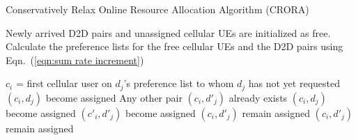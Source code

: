 \documentclass[times]{dacauth}
\begin{document}
\par
 \begin{algorithm}	
   \caption{Conservatively Relax Online Resource Allocation Algorithm (CRORA)}
   \label{algorthm3}
    \begin{algorithmic}[1]

       \State Newly arrived D2D pairs and unassigned cellular UEs are initialized as free.  
        \State Calculate the preference lists for the free cellular UEs and the D2D pairs using Eqn.~(\ref{eqn:sum rate increment})
			
		
			\State $c_i$ = first cellular user on $d_j$'s preference list to whom $d_j$ has not yet requested
				\State $(c_i,d_j)$ become assigned
			\Else
				\State Any other pair $(c_i, d'_j)$ already exists
                     	\State $(c_i,d_j)$ become assigned
                     	\State $(c'_i,d'_j)$ become assigned                     	
					 \Else
						\State $(c_i, d'_j)$ remain assigned
						\EndIf						
 	            \Else
					\State $(c_i, d'_j)$ remain assigned
					
				\EndIf
			\EndIf
		\EndWhile      	
	\EndProcedure

\end{algorithmic}
\end{algorithm}
\end{document}
